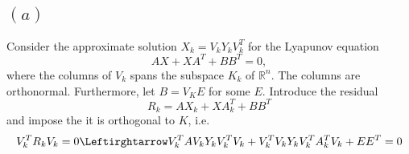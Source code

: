 
\subsection{$(a)$}
Consider the approximate solution $X_{k} = V_{k}Y_{k}V_{k}^{T}$ for the Lyapunov equation
\begin{equation}
  AX+XA^{T} + BB^{T} = 0,
\end{equation}
where the columns of $V_{k}$ spans the subspace $K_{k}$ of $\mathbb{R}^{n}$. The columns are orthonormal. Furthermore, let $B = V_{K}E$ for some $E$. Introduce the residual
\begin{equation}
  R_{k} = AX_{k}+XA_{k}^{T} + BB^{T}
\end{equation}
and impose the it is orthogonal to $K$, i.e.
\begin{equation}
  V_{k}^{T}R_{k}V_{k} = 0 \Leftirghtarrow V_{k}^{T}AV_{k}Y_{k}V_{k}^{T}V_{k}+V_{k}^{T}V_{k}Y_{k}V_{k}^{T}A_{k}^{T}V_{k} + EE^{T} = 0
\end{equation}
